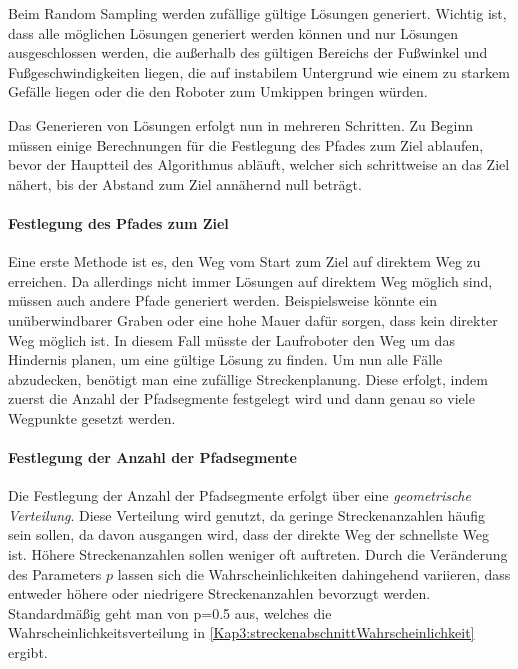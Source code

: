 Beim Random Sampling werden zufällige gültige Lösungen generiert.  Wichtig ist, dass alle möglichen Lösungen generiert werden können und nur Lösungen ausgeschlossen werden, die außerhalb des gültigen Bereichs der Fußwinkel und Fußgeschwindigkeiten liegen, die auf instabilem Untergrund wie einem zu starkem Gefälle liegen oder die den Roboter zum Umkippen bringen würden.

Das Generieren von Lösungen erfolgt nun in mehreren Schritten. Zu Beginn müssen einige Berechnungen für die Festlegung des Pfades zum Ziel ablaufen, bevor der Hauptteil des Algorithmus abläuft, welcher sich schrittweise an das Ziel nähert, bis der Abstand zum Ziel annähernd null beträgt.

\paragraph{Festlegung des Pfades zum Ziel}

Eine erste Methode ist es, den Weg vom Start zum Ziel auf direktem Weg zu erreichen. Da allerdings nicht immer Lösungen auf direktem Weg möglich sind, müssen auch andere Pfade generiert werden. Beispielsweise könnte ein unüberwindbarer Graben oder eine hohe Mauer dafür sorgen, dass kein direkter Weg möglich ist. In diesem Fall müsste der Laufroboter den Weg um das Hindernis planen, um eine gültige Lösung zu finden. Um nun alle Fälle abzudecken, benötigt man eine zufällige Streckenplanung. Diese erfolgt, indem zuerst die Anzahl der Pfadsegmente festgelegt wird und dann genau so viele Wegpunkte gesetzt werden.

\paragraph{Festlegung der Anzahl der Pfadsegmente}

Die Festlegung der Anzahl der Pfadsegmente erfolgt über eine \emph{geometrische Verteilung}. Diese Verteilung wird genutzt, da geringe Streckenanzahlen häufig sein sollen, da davon ausgangen wird, dass der direkte Weg der schnellste Weg ist. Höhere Streckenanzahlen sollen weniger oft auftreten. Durch die Veränderung des Parameters $p$ lassen sich die Wahrscheinlichkeiten dahingehend variieren, dass entweder höhere oder niedrigere Streckenanzahlen bevorzugt werden. Standardmäßig geht man von p=\SI{0.5}{} aus, welches die Wahrscheinlichkeitsverteilung in \autoref{Kap3:streckenabschnittWahrscheinlichkeit} ergibt.

